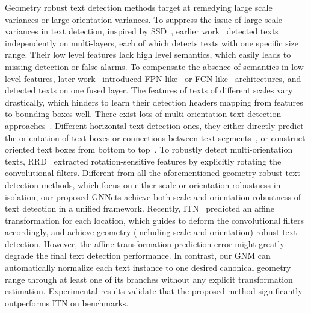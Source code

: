 \documentclass[10pt,twocolumn,letterpaper]{article}
\begin{document}
 Geometry robust text detection methods target at remedying large scale variances or large orientation variances. To suppress the issue of large scale variances in text detection, inspired by SSD~\cite{Liu2016}, earlier work~\cite{Liao2017,Shi2017,He2017a} detected texts independently on multi-layers, each of which detects texts with one specific size range. Their low level features lack high level semantics, which easily leads to missing detection or false alarms. To compensate the absence of semantics in low-level features, later work~\cite{Zhou2017,liu2018fots,li2018shape,dai2018fused} introduced FPN-like~\cite{lin2017feature} or FCN-like~\cite{Long2015} architectures, and detected texts on one fused layer. The features of texts of different scales vary drastically, which hinders to learn their detection headers mapping from features to bounding boxes well.  There exist lots of multi-orientation text detection approaches~\cite{Zhou2017,Liao2017,He2017a,wang2018geometry,liao2018rotation,liu2018fots,li2018shape}. Different horizontal text detection ones,  they either directly predict the orientation of text boxes or connections between text segments~\cite{Zhou2017,Liao2017,He2017a,liao2018rotation,liu2018fots},  or construct oriented text boxes from bottom to top~\cite{li2018shape,Long2018}. To robustly detect multi-orientation texts, RRD~\cite{liao2018rotation} extracted rotation-sensitive features by explicitly rotating the convolutional filters.
 Different from all the aforementioned geometry robust text detection methods, which focus on either scale or orientation robustness in isolation, our proposed GNNets achieve both scale and orientation robustness of text detection in a unified framework.
 Recently, ITN~\cite{wang2018geometry} predicted an affine transformation for each location, which guides to deform the convolutional filters accordingly, and achieve geometry (including scale and orientation) robust text detection. However, the affine transformation prediction error might greatly degrade the final text detection performance. In contrast, our GNM can automatically normalize each text instance to one desired canonical geometry range through at least one of its branches without any explicit transformation estimation. Experimental results validate that the proposed method significantly outperforms ITN on benchmarks.
\end{document}
